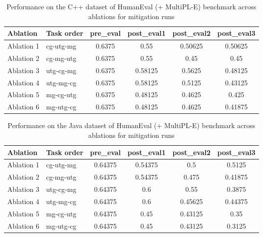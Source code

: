 \begin{table}[!ht]
    \centering
    \caption{Performance on the C++ dataset of HumanEval (+ MultiPL-E) benchmark across ablations for mitigation runs}
    \begin{tabular}{|l|l|S[table-format=2.4]|S[table-format=2.4]|S[table-format=2.4]|S[table-format=2.4]|}
    \hline
        \textbf{Ablation} & \textbf{Task order} & \textbf{pre\_eval} & \textbf{post\_eval1} & \textbf{post\_eval2} & \textbf{post\_eval3 } \\ \hline
        Ablation 1 & cg-utg-mg & 0.6375 & 0.55 & 0.50625 & 0.50625  \\ 
        Ablation 2 & cg-mg-utg & 0.6375 & 0.55 & 0.45 & 0.45  \\
        Ablation 3 & utg-cg-mg & 0.6375 & 0.58125 & 0.5625 & 0.48125  \\ 
        Ablation 4 & utg-mg-cg & 0.6375 & 0.58125 & 0.5125 & 0.43125  \\ 
        Ablation 5 & mg-cg-utg & 0.6375 & 0.48125 & 0.4625 & 0.425  \\ 
        Ablation 6 & mg-utg-cg & 0.6375 & 0.48125 & 0.4625 & 0.41875 \\ \hline
    \end{tabular}
    \label{tab:CppMitigation}
\end{table}

\begin{table}[!ht]
    \centering
    \caption{Performance on the Java dataset of HumanEval (+ MultiPL-E) benchmark across ablations for mitigation runs}
    \begin{tabular}{|l|l|S[table-format=2.4]|S[table-format=2.4]|S[table-format=2.4]|S[table-format=2.4]|}
    \hline
        \textbf{Ablation} & \textbf{Task order} & \textbf{pre\_eval} & \textbf{post\_eval1} & \textbf{post\_eval2} & \textbf{post\_eval3 } \\ \hline
        Ablation 1 & cg-utg-mg & 0.64375 & 0.54375 & 0.5 & 0.5125  \\ 
        Ablation 2 & cg-mg-utg & 0.64375 & 0.54375 & 0.475 & 0.41875  \\ 
        Ablation 3 & utg-cg-mg & 0.64375 & 0.6 & 0.55 & 0.3875  \\ 
        Ablation 4 & utg-mg-cg & 0.64375 & 0.6 & 0.45625 & 0.44375  \\ 
        Ablation 5 & mg-cg-utg & 0.64375 & 0.45 & 0.43125 & 0.35  \\ 
        Ablation 6 & mg-utg-cg & 0.64375 & 0.45 & 0.43125 & 0.3125 \\ \hline
    \end{tabular}
    \label{tab:JavaMitigation}
\end{table}

